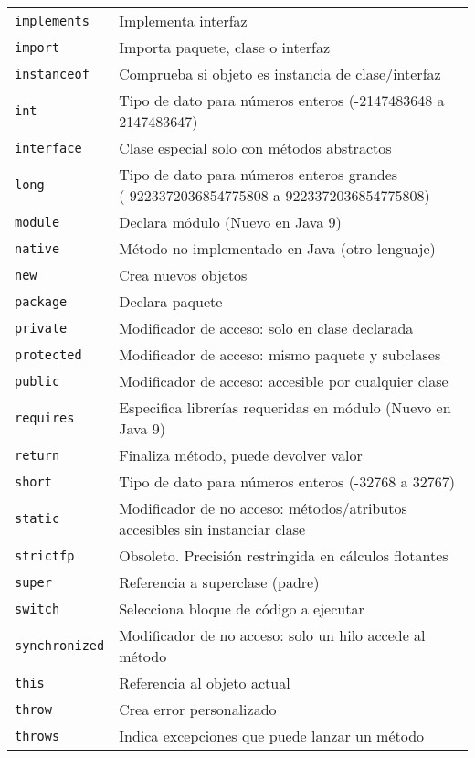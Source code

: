 \documentclass[12pt]{article}
\theoremstyle{largebreak}
\begin{document}
\begin{longtable}{l p{}}
    \lstinline|implements| & Implementa interfaz \\
    \lstinline|import| & Importa paquete, clase o interfaz \\
    \lstinline|instanceof| & Comprueba si objeto es instancia de clase/interfaz \\
    \lstinline|int| & Tipo de dato para números enteros (-2147483648 a 2147483647) \\
    \lstinline|interface| & Clase especial solo con métodos abstractos \\
    \lstinline|long| & Tipo de dato para números enteros grandes (-9223372036854775808 a 9223372036854775808) \\
    \lstinline|module| & Declara módulo (Nuevo en Java 9) \\
    \lstinline|native| & Método no implementado en Java (otro lenguaje) \\
    \lstinline|new| & Crea nuevos objetos \\
    \lstinline|package| & Declara paquete \\
    \lstinline|private| & Modificador de acceso: solo en clase declarada \\
    \lstinline|protected| & Modificador de acceso: mismo paquete y subclases \\
    \lstinline|public| & Modificador de acceso: accesible por cualquier clase \\
    \lstinline|requires| & Especifica librerías requeridas en módulo (Nuevo en Java 9) \\
    \lstinline|return| & Finaliza método, puede devolver valor \\
    \lstinline|short| & Tipo de dato para números enteros (-32768 a 32767) \\
    \lstinline|static| & Modificador de no acceso: métodos/atributos accesibles sin instanciar clase \\
    \lstinline|strictfp| & Obsoleto. Precisión restringida en cálculos flotantes \\
    \lstinline|super| & Referencia a superclase (padre) \\
    \lstinline|switch| & Selecciona bloque de código a ejecutar \\
    \lstinline|synchronized| & Modificador de no acceso: solo un hilo accede al método \\
    \lstinline|this| & Referencia al objeto actual \\
    \lstinline|throw| & Crea error personalizado \\
    \lstinline|throws| & Indica excepciones que puede lanzar un método \\

\end{longtable}
\end{document}

